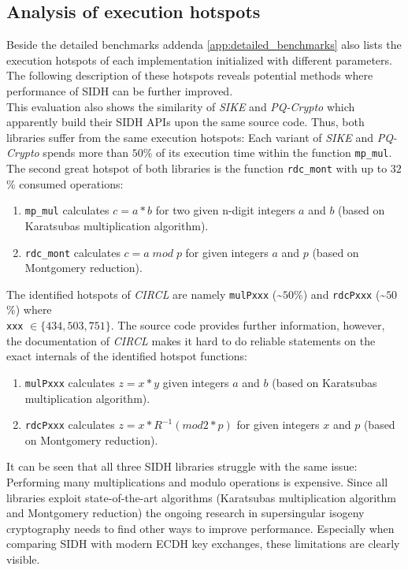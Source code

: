 \subsection{Analysis of execution hotspots}\label{sec:analysis_sidh_hotspots}
Beside the detailed benchmarks addenda \ref{app:detailed_benchmarks} also lists the execution hotspots of each implementation initialized with different parameters. The following description of these hotspots reveals potential methods where performance of SIDH can be further improved.\\
This evaluation also shows the similarity of \textit{SIKE} and \textit{PQ-Crypto} which apparently build their SIDH APIs upon the same source code. Thus, both libraries suffer from the same execution hotspots: Each variant of \textit{SIKE} and \textit{PQ-Crypto} spends more than $50$\% of its execution time within the function \texttt{mp\_mul}. The second great hotspot of both libraries is the function \texttt{rdc\_mont} with up to $32$\% consumed operations:
\begin{enumerate}
\item \texttt{mp\_mul} calculates $c=a*b$ for two given n-digit integers $a$ and $b$ (based on Karatsubas multiplication algorithm).
\item \texttt{rdc\_mont} calculates $c = a\;mod\;p$ for given integers $a$ and $p$ (based on Montgomery reduction).
\end{enumerate}
The identified hotspots of \textit{CIRCL} are namely \texttt{mulPxxx} (\textasciitilde $50$\%) and \texttt{rdcPxxx} (\textasciitilde $50$\%) where \\\texttt{xxx} $\in \{434, 503, 751\}$. The source code provides further information, however, the documentation of \textit{CIRCL} makes it hard to do reliable statements on the exact internals of the identified hotspot functions:
\begin{enumerate}
\item \texttt{mulPxxx} calculates $z=x*y$ given integers $a$ and $b$ (based on Karatsubas multiplication algorithm).
\item \texttt{rdcPxxx} calculates $z = x*R^{-1} (mod 2*p)$ for given integers $x$ and $p$ (based on Montgomery reduction).
\end{enumerate}
It can be seen that all three SIDH libraries struggle with the same issue: Performing many multiplications and modulo operations is expensive. Since all libraries exploit state-of-the-art algorithms (Karatsubas multiplication algorithm and Montgomery reduction) the ongoing research in supersingular isogeny cryptography needs to find other ways to improve performance. Especially when comparing SIDH with modern ECDH key exchanges, these limitations are clearly visible.

